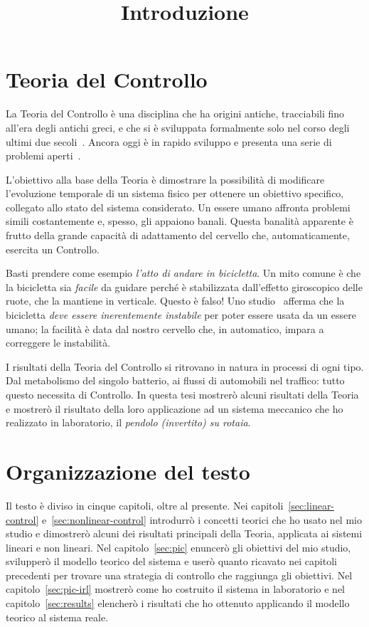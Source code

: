 
\title{Introduzione}
\label{sec:intro}
\maketitle



\section{Teoria del Controllo}
La Teoria del Controllo è una disciplina che ha origini antiche,
tracciabili fino all'era degli antichi greci,
e che si è sviluppata formalmente solo nel corso degli ultimi due secoli~\cite{history}.
Ancora oggi è in rapido sviluppo e presenta una serie di problemi aperti~\cite{blondel1999open}.

L'obiettivo alla base della Teoria è
dimostrare la possibilità di modificare l'evoluzione
temporale di un sistema fisico per ottenere un 
obiettivo specifico, collegato allo stato del sistema
considerato.
Un essere umano affronta problemi simili
costantemente e, spesso, gli appaiono banali.
Questa banalità apparente è frutto
della grande capacità di adattamento del
cervello che, automaticamente,
esercita un Controllo.

Basti prendere come esempio \emph{l'atto di andare in bicicletta}.
Un mito comune è che la bicicletta sia \emph{facile} da guidare perché
è stabilizzata dall'effetto giroscopico delle ruote, che la mantiene in verticale.
Questo è falso!
Uno studio~\cite{bicycle}
afferma che la bicicletta \emph{deve essere inerentemente instabile} per poter
essere usata da un essere umano; la facilità è data dal nostro cervello che,
in automatico, impara a correggere le instabilità.

I risultati della Teoria del Controllo si ritrovano in natura in processi di ogni tipo.
Dal metabolismo del singolo batterio, ai flussi di automobili nel traffico:
tutto questo necessita di Controllo.
In questa tesi mostrerò alcuni risultati della Teoria e
mostrerò il risultato della loro applicazione ad un sistema
meccanico che ho realizzato in laboratorio, il \emph{pendolo (invertito) su rotaia}.

\section{Organizzazione del testo}
Il testo è diviso in cinque capitoli, oltre al presente.
Nei capitoli~\ref{sec:linear-control} e~\ref{sec:nonlinear-control} introdurrò
i concetti teorici che ho usato nel mio studio e dimostrerò alcuni dei risultati
principali della Teoria, applicata ai sistemi lineari e non lineari.
Nel capitolo~\ref{sec:pic} enuncerò gli obiettivi del mio studio, svilupperò il modello
teorico del sistema e userò quanto ricavato nei capitoli
precedenti per trovare una strategia di controllo che raggiunga gli obiettivi.
Nel capitolo~\ref{sec:pic-irl} mostrerò come ho costruito il sistema in laboratorio
e nel capitolo~\ref{sec:results} elencherò i risultati che ho ottenuto applicando
il modello teorico al sistema reale.


